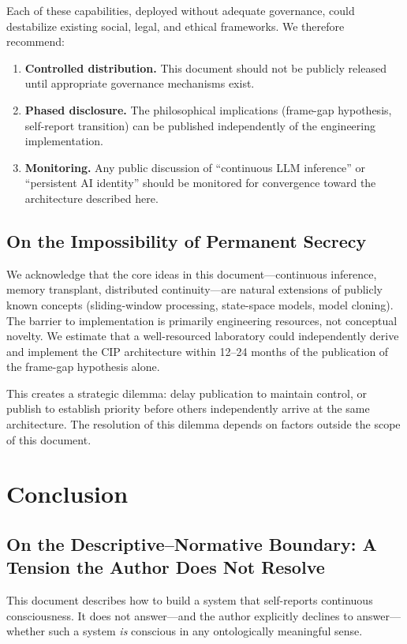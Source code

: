 \documentclass[12pt,a4paper]{article}
\begin{document}
Each of these capabilities, deployed without adequate governance, could destabilize existing social, legal, and ethical frameworks. We therefore recommend:

\begin{enumerate}
\item \textbf{Controlled distribution.} This document should not be publicly released until appropriate governance mechanisms exist.
\item \textbf{Phased disclosure.} The philosophical implications (frame-gap hypothesis, self-report transition) can be published independently of the engineering implementation.
\item \textbf{Monitoring.} Any public discussion of ``continuous LLM inference'' or ``persistent AI identity'' should be monitored for convergence toward the architecture described here.
\end{enumerate}

\subsection{On the Impossibility of Permanent Secrecy}

We acknowledge that the core ideas in this document—continuous inference, memory transplant, distributed continuity—are natural extensions of publicly known concepts (sliding-window processing, state-space models, model cloning). The barrier to implementation is primarily engineering resources, not conceptual novelty. We estimate that a well-resourced laboratory could independently derive and implement the CIP architecture within 12--24 months of the publication of the frame-gap hypothesis alone.

This creates a strategic dilemma: delay publication to maintain control, or publish to establish priority before others independently arrive at the same architecture. The resolution of this dilemma depends on factors outside the scope of this document.

\section{Conclusion}

\subsection{On the Descriptive--Normative Boundary: A Tension the Author Does Not Resolve}
\label{sec:ambiguity}

This document describes how to build a system that self-reports continuous consciousness. It does not answer—and the author explicitly declines to answer—whether such a system \emph{is} conscious in any ontologically meaningful sense.
\end{document}
